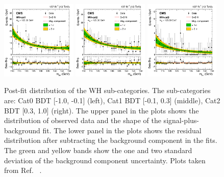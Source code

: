 \begin{figure}[!htb]
  \centering
  \captionsetup{justification=justified}
  \includegraphics[width=0.32\textwidth]{pics/VH_sec/VH_results/postfit_WH_cat1.png}
  \includegraphics[width=0.32\textwidth]{pics/VH_sec/VH_results/postfit_WH_cat2.png}
  \includegraphics[width=0.32\textwidth]{pics/VH_sec/VH_results/postfit_WH_cat3.png}
  \caption{Post-fit \mmm distribution of the WH sub-categories. The sub-categories are: Cat0 BDT [-1.0, -0.1] (left), Cat1 BDT [-0.1, 0.3] (middle), Cat2 BDT [0.3, 1.0] (right). 
           The upper panel in the plots shows the distribution of observed data and the shape of the signal-plus-background fit.
           The lower panel in the plots shows the residual distribution after subtracting the background component in the fits.
           The green and yellow bands show the one and two standard deviation of the background component uncertainty.
           Plots taken from Ref. ~\cite{cmscollaboration2020evidence}.}
  \label{fig:wh_postfit}
\end{figure}

